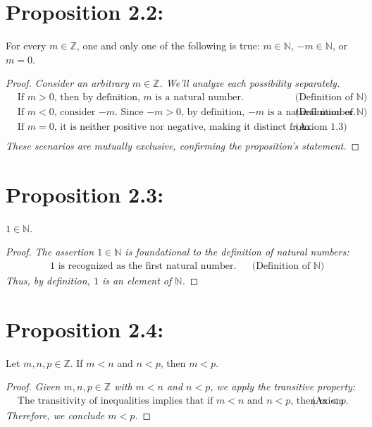 \section*{Proposition 2.2:}
For every $m \in \mathbb{Z}$, one and only one of the following is true: $m \in \mathbb{N}$, $-m \in \mathbb{N}$, or $m = 0$.
\begin{proof}
    \textit{Consider an arbitrary $m \in \mathbb{Z}$. We'll analyze each possibility separately.}
    \begin{align*}
        & \text{If $m > 0$, then by definition, $m$ is a natural number.} & & \text{(Definition of $\mathbb{N}$)} \\
        & \text{If $m < 0$, consider $-m$. Since $-m > 0$, by definition, $-m$ is a natural number.} & & \text{(Definition of $\mathbb{N}$)} \\
        & \text{If $m = 0$, it is neither positive nor negative, making it distinct from natural numbers.} & & \text{(Axiom 1.3)} \\
    \end{align*}
    \textit{These scenarios are mutually exclusive, confirming the proposition's statement.}
\end{proof}



\section*{Proposition 2.3:}
$1 \in \mathbb{N}$.
\begin{proof}
    \textit{The assertion $1 \in \mathbb{N}$ is foundational to the definition of natural numbers:}
    \begin{align*}
        & \text{$1$ is recognized as the first natural number.} & & \text{(Definition of $\mathbb{N}$)}
    \end{align*}
    \textit{Thus, by definition, $1$ is an element of $\mathbb{N}$.}
\end{proof}


\section*{Proposition 2.4:}
Let $m,n,p \in \mathbb{Z}$. If $m < n$ and $n < p$, then $m < p$.
\begin{proof}
    \textit{Given $m, n, p \in \mathbb{Z}$ with $m < n$ and $n < p$, we apply the transitive property:}
    \begin{align*}
        & \text{The transitivity of inequalities implies that if $m < n$ and $n < p$, then $m < p$.} & & \text{(Axiom 1.1)}
    \end{align*}
    \textit{Therefore, we conclude $m < p$.}
\end{proof}


